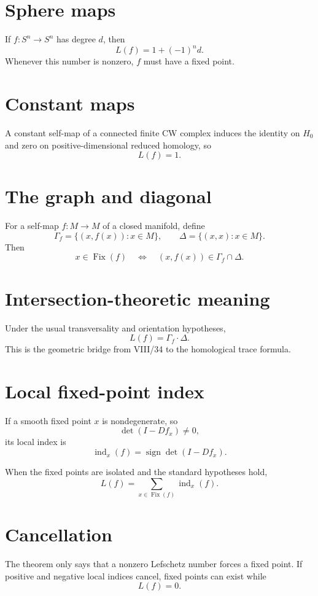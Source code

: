 \section{Sphere maps}
If $f:S^n\to S^n$ has degree $d$, then
\[
L(f)=1+(-1)^n d.
\]
Whenever this number is nonzero, $f$ must have a fixed point.

\section{Constant maps}
A constant self-map of a connected finite CW complex induces the identity on
$H_0$ and zero on positive-dimensional reduced homology, so
\[
L(f)=1.
\]

\section{The graph and diagonal}
For a self-map $f:M\to M$ of a closed manifold, define
\[
\Gamma_f=\{(x,f(x)):x\in M\},
\qquad
\Delta=\{(x,x):x\in M\}.
\]
Then
\[
x\in\operatorname{Fix}(f)
\quad\Longleftrightarrow\quad
(x,f(x))\in\Gamma_f\cap\Delta.
\]

\section{Intersection-theoretic meaning}
Under the usual transversality and orientation hypotheses,
\[
L(f)=\Gamma_f\cdot\Delta.
\]
This is the geometric bridge from VIII/34 to the homological trace formula.

\section{Local fixed-point index}
If a smooth fixed point $x$ is nondegenerate, so
\[
\det(I-Df_x)\ne0,
\]
its local index is
\[
\operatorname{ind}_x(f)=\operatorname{sign}\det(I-Df_x).
\]

\begin{theorem}
\label{thm:viii35-lefschetz-hopf}
When the fixed points are isolated and the standard hypotheses hold,
\[
L(f)=\sum_{x\in\operatorname{Fix}(f)}\operatorname{ind}_x(f).
\]
\end{theorem}

\section{Cancellation}
The theorem only says that a nonzero Lefschetz number forces a fixed point.
If positive and negative local indices cancel, fixed points can exist while
\[
L(f)=0.
\]

